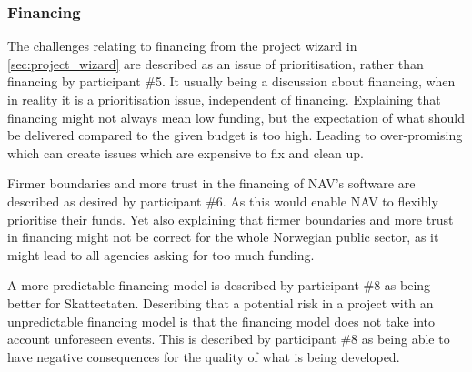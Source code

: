 \subsubsection{Financing} \label{sec:financing}
The challenges relating to financing from the project wizard in \autoref{sec:project_wizard} are described as an issue of prioritisation, rather than financing by participant \#5. It usually being a discussion about financing, when in reality it is a prioritisation issue, independent of financing. Explaining that financing might not always mean low funding, but the expectation of what should be delivered compared to the given budget is too high. Leading to over-promising which can create issues which are expensive to fix and clean up.


Firmer boundaries and more trust in the financing of NAV's software are described as desired by participant \#6. As this would enable NAV to flexibly prioritise their funds. Yet also explaining that firmer boundaries and more trust in financing might not be correct for the whole Norwegian public sector, as it might lead to all agencies asking for too much funding. 


A more predictable financing model is described by participant \#8 as being better for Skatteetaten. Describing that a potential risk in a project with an unpredictable financing model is that the financing model does not take into account unforeseen events. This is described by participant \#8 as being able to have negative consequences for the quality of what is being developed.

